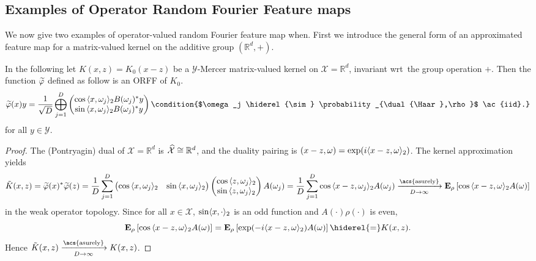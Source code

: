 \subsection{Examples of Operator Random Fourier Feature maps}
\label{subsec:examples_ORFF} We now give two examples of operator-valued random
Fourier feature map when. First we introduce the general form of an
approximated feature map for a matrix-valued kernel on the additive group
$(\mathbb{R}^d,+)$.
\begin{example}
    \label{ex:additive_group} In the following let $K(x,z)=K_0(x-z)$ be a
    $\mathcal{Y}$-Mercer matrix-valued kernel on $\mathcal{X}=\mathbb{R}^d$,
    invariant \acs{wrt}~the group operation $+$. Then the function
    $\tildePhi{\omega}$ defined as follow is an \acl{ORFF} of $K_{0}$.
    \begin{dmath*}
        \tildePhi{\omega}(x)y=\frac{1}{\sqrt{D}}\Vect_{j=1}^D
        \begin{pmatrix}
            \cos{\inner{x,\omega_j}_2}B(\omega_j)^\adjoint y \\ 
            \sin{\inner{x,\omega_j}_2}B(\omega_j)^\adjoint y
        \end{pmatrix}
        \condition{$\omega_j \hiderel{\sim} \probability_{\dual{\Haar},\rho}$
        \ac{iid}.}
    \end{dmath*}
    for all $y\in\mathcal{Y}$.
\end{example}
\begin{proof}
    The (Pontryagin) dual of $\mathcal{X}=\mathbb{R}^d$ is
    $\widehat{\mathcal{X}}\cong\mathbb{R}^d$, and the duality pairing is
    $(x-z,\omega)=\exp(i\langle x-z, \omega\rangle_2)$. The kernel
    approximation yields
    \begin{dmath*}
        \tilde{K}(x,z)=\tildePhi{\omega}(x)^\adjoint \tildePhi{\omega}(z)
        = \frac{1}{D} \sum_{j=1}^D \begin{pmatrix} \cos{\inner{x,\omega_j}_2} &
        \sin{\inner{x,\omega_j}_2}
        \end{pmatrix}\begin{pmatrix}\cos{\inner{z,\omega_j}_2} \\
        \sin{\inner{z,\omega_j}_2} \end{pmatrix} A(\omega_j)
        = \frac{1}{D} \sum_{j=1}^D \cos{\inner{x-z,\omega_j}_2}A(\omega_j) \\
        \converges{\acs{asurely}}{D \to \infty} \expectation_\rho
        \left[\cos{\inner{x - z,\omega}_2} A(\omega)\right]
    \end{dmath*}
    in the weak operator topology. Since for all $x\in\mathcal{X}$,
    $\sin\langle x, \cdot\rangle_2$ is an odd function and $A(\cdot)\rho(\cdot)$ is
    even,
    \begin{dmath*}
        \expectation_\rho\left[\cos{\inner{x-z,\omega}_2}A(\omega)\right]
        = \expectation_\rho \left[\exp(-i\inner{x-z,\omega}_2)A(\omega)\right]
        \hiderel{=}K(x,z).
    \end{dmath*}
    Hence $\tilde{K}(x,z)\converges{\acs{asurely}}{D\to\infty}K(x,z)$.
\end{proof}
